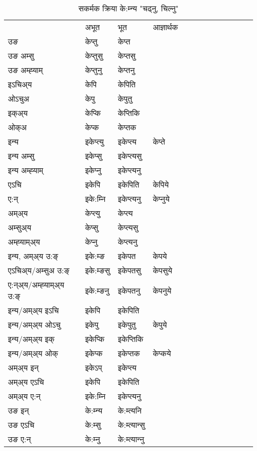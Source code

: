 \begin{table}[H]
\label{ept.vt} \centering
\caption{सकर्मक क्रिया  के:म्‍न्य  "चढ्नु, चिल्नु"  }
\begin{tabular}{l|l|l|l|l|l|l|l|l|l|l|l|l}  \toprule
&अभूत & भूत & आज्ञार्थक \\ 
उङ &केप्‍तु &केप्‍त \\ 
उङ अम्सु&केप्‍तुसु &केप्‍तसु \\ 
उङ अम्ह्‍याम्&केप्‍तुनु &केप्‍तनु \\ 
इऽचिअ्य &केपि &केपिति   \\ 
ओऽचुअ        &केपु &केपुतु   \\ 
इक्अ्य&केप्कि &केप्‍तिकि   \\ 
ओक्अ &केप्क &केप्‍तक   \\ 
इन्य & इकेप्‍त्यु  & इकेप्‍त्य &केप्‍ते  \\ 
इन्य अम्सु& इकेप्सु  & इकेप्‍त्यसु   \\ 
इन्य अम्ह्‍याम्& इकेप्‍नु  & इकेप्‍त्यनु   \\ 
एऽचि & इकेपि & इकेपिति &केपिये    \\ 
ए:न् & इके:म्‍नि  & इकेप्‍त्यनु &केप्‍नुये  \\ 
अम्अ्य & केप्‍त्यु  & केप्‍त्य  \\ 
अम्सुअ्य & केप्सु & केप्‍त्यसु  \\ 
अम्ह्‍याम्अ्य & केप्‍नु  & केप्‍त्यनु \\ 
\midrule
इन्य, अम्अ्य उ:ङ्‌ &इके:म्ङ &इकेपत &केपये \\ 
एऽचिअ्य/अम्सुअ उ:ङ्‌ &इके:म्ङसु &इकेपतसु &केपसुये \\ 
ए:न्अ्य/अम्ह्‍याम्अ्य उ:ङ्‌ &इके:म्ङनु &इकेपतनु &केपनुये \\ 
इन्य/अम्अ्य इऽचि &इकेपि &इकेपिति    \\ 
इन्य/अम्अ्य ओऽचु &इकेपु &इकेपुतु  &केपुये  \\ 
इन्य/अम्अ्य इक् &इकेप्कि &इकेप्‍तिकि   \\ 
इन्य/अम्अ्य ओक् &इकेप्क &इकेप्‍तक  &केप्कये  \\ 
अम्अ्य इन् & इकेऽप् & इकेप्‍त्य   \\ 
अम्अ्य एऽचि & इकेपि & इकेपिति    \\ 
अम्अ्य ए:न् & इके:म्‍नि  & इकेप्‍त्यनु  \\ 
\midrule
उङ इन् & के:म्‍न्य  & के:म्त्यनि  \\ 
उङ एऽचि & के:म्सु  & के:म्त्यान्सु   \\ 
उङ ए:न्& के:म्‍नु  & के:म्त्यान्‍नु   \\ 
\bottomrule
\end{tabular}
\end{table}



